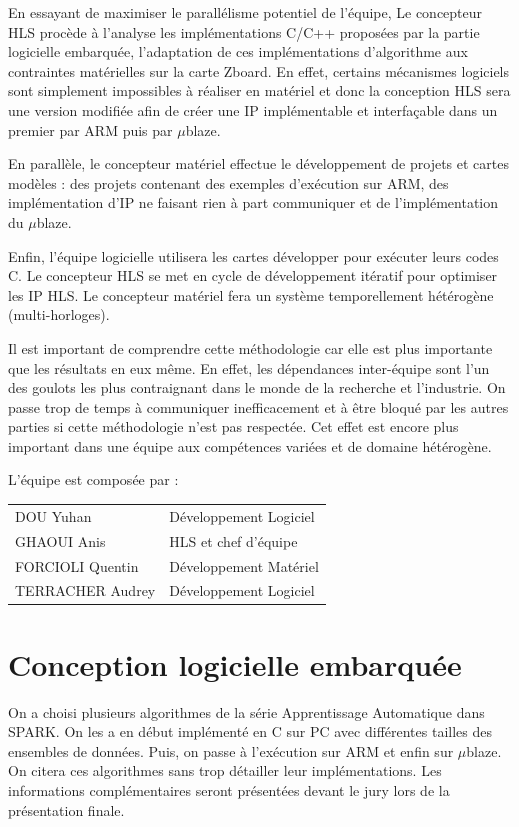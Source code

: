 \documentclass[12pt,a4paper]{article}
\begin{document}
En essayant de maximiser le parallélisme potentiel de l'équipe, Le concepteur HLS procède à l'analyse les implémentations C/C++ proposées par la partie logicielle embarquée, l'adaptation de ces implémentations d'algorithme aux contraintes matérielles sur la carte Zboard. En effet, certains mécanismes logiciels sont simplement impossibles à réaliser en matériel et donc la conception HLS sera une version modifiée afin de créer une IP implémentable et interfaçable dans un premier par ARM puis par $\mu$blaze.

En parallèle, le concepteur matériel effectue le développement de projets et cartes modèles : des projets contenant des exemples d'exécution sur ARM, des implémentation d'IP ne faisant rien à part communiquer et de l'implémentation du $\mu$blaze.

Enfin, l'équipe logicielle utilisera les cartes développer pour exécuter leurs codes C. Le concepteur HLS se met en cycle de développement itératif pour optimiser les IP HLS. Le concepteur matériel fera un système temporellement hétérogène (multi-horloges).

Il est important de comprendre cette méthodologie car elle est plus importante que les résultats en eux même. En effet, les dépendances inter-équipe sont l'un des goulots les plus contraignant dans le monde de la recherche et l'industrie. On passe trop de temps à communiquer inefficacement et à être bloqué par les autres parties si cette méthodologie n'est pas respectée. Cet effet est encore plus important dans une équipe aux compétences variées et de domaine hétérogène.

L'équipe est composée par :
\begin{tabular}{ll}
DOU Yuhan & Développement Logiciel\\
GHAOUI Anis & HLS et chef d'équipe\\
FORCIOLI Quentin & Développement Matériel\\
TERRACHER Audrey & Développement Logiciel
\end{tabular}

\section{Conception logicielle embarquée}
On a choisi plusieurs algorithmes de la série Apprentissage Automatique dans SPARK. On les a en début implémenté en C sur PC avec différentes tailles des ensembles de données. Puis, on passe à l'exécution sur ARM et enfin sur $\mu$blaze. On citera ces algorithmes sans trop détailler leur implémentations. Les informations complémentaires seront présentées devant le jury lors de la présentation finale.
\end{document}
